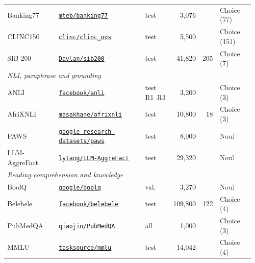 \begin{tabular}{l l l r r l}
    Banking77~\cite{casanueva-etal-2020-efficient} & {\scriptsize\href{https://huggingface.co/datasets/mteb/banking77}{\texttt{mteb/banking77}}} & test & 3{,}076 &  & Choice (77) \\
    \rowcolor{gray!10}CLINC150~\cite{larson-etal-2019-evaluation} & {\scriptsize\href{https://huggingface.co/datasets/clinc/clinc_oos}{\texttt{clinc/clinc\_oos}}} & test & 5{,}500 &  & Choice (151) \\
    SIB-200~\cite{adelani-etal-2024-sib} & {\scriptsize\href{https://huggingface.co/datasets/Davlan/sib200}{\texttt{Davlan/sib200}}} & test & 41{,}820 & 205 & Choice (7) \\
    \midrule
    \multicolumn{6}{l}{\textit{NLI, paraphrase and grounding}} \\
    ANLI~\cite{nie-etal-2020-adversarial} & {\scriptsize\href{https://huggingface.co/datasets/facebook/anli}{\texttt{facebook/anli}}} & test R1--R3 & 3{,}200 &  & Choice (3) \\
    \rowcolor{gray!10}AfriXNLI~\cite{adelani-etal-2025-irokobench} & {\scriptsize\href{https://huggingface.co/datasets/masakhane/afrixnli}{\texttt{masakhane/afrixnli}}} & test & 10{,}800 & 18 & Choice (3) \\
    PAWS~\cite{zhang-etal-2019-paws} & {\scriptsize\href{https://huggingface.co/datasets/google-research-datasets/paws}{\texttt{google-research-datasets/paws}}} & test & 8{,}000 &  & Noul \\
    \rowcolor{gray!10}LLM-AggreFact~\cite{tang-etal-2024-minicheck} & {\scriptsize\href{https://huggingface.co/datasets/lytang/LLM-AggreFact}{\texttt{lytang/LLM-AggreFact}}} & test & 29{,}320 &  & Noul \\
    \midrule
    \multicolumn{6}{l}{\textit{Reading comprehension and knowledge}} \\
    BoolQ~\cite{clark-etal-2019-boolq} & {\scriptsize\href{https://huggingface.co/datasets/google/boolq}{\texttt{google/boolq}}} & val. & 3{,}270 &  & Noul \\
    \rowcolor{gray!10}Belebele~\cite{bandarkar-etal-2024-belebele} & {\scriptsize\href{https://huggingface.co/datasets/facebook/belebele}{\texttt{facebook/belebele}}} & test & 109{,}800 & 122 & Choice (4) \\
    PubMedQA~\cite{jin-etal-2019-pubmedqa} & {\scriptsize\href{https://huggingface.co/datasets/qiaojin/PubMedQA}{\texttt{qiaojin/PubMedQA}}} & all & 1{,}000 &  & Choice (3) \\
    \rowcolor{gray!10}MMLU~\cite{hendrycks2021measuringmassivemultitasklanguage} & {\scriptsize\href{https://huggingface.co/datasets/tasksource/mmlu}{\texttt{tasksource/mmlu}}} & test & 14{,}042 &  & Choice (4) \\

\end{tabular}
